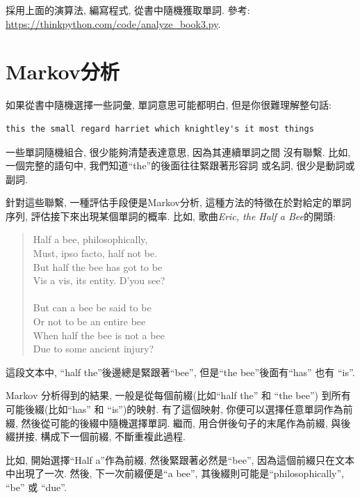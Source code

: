 \documentclass[10pt]{book}
\begin{document}
\begin{exercise}
\label{randhist}

採用上面的演算法, 編寫程式, 從書中隨機獲取單詞. 參考:
\url{https://thinkpython.com/code/analyze_book3.py}.

\end{exercise}



\section{Markov分析}
\label{markov}
如果從書中隨機選擇一些詞彙, 單詞意思可能都明白, 
但是你很難理解整句話:

\begin{verbatim}
this the small regard harriet which knightley's it most things
\end{verbatim}
%
一些單詞隨機組合, 很少能夠清楚表達意思, 因為其連續單詞之間
沒有聯繫. 比如, 一個完整的語句中, 我們知道``the''的後面往往緊跟著形容詞
或名詞, 很少是動詞或副詞. 

針對這些聯繫, 一種評估手段便是Markov分析, 這種方法的特徵在於對給定的單詞序列, 
評估接下來出現某個單詞的概率. 比如, 歌曲{\em Eric, the Half a Bee}的開頭:

\begin{quote}
Half a bee, philosophically, \\
Must, ipso facto, half not be. \\
But half the bee has got to be \\
Vis a vis, its entity. D'you see? \\
\\
But can a bee be said to be \\
Or not to be an entire bee \\
When half the bee is not a bee \\
Due to some ancient injury? \\
\end{quote}
%
這段文本中, ``half the''後邊總是緊跟著``bee'',
但是``the bee''後面有``has'' 也有 ``is''.

Markov 分析得到的結果, 一般是從每個前綴(比如``half the'' 和 ``the bee'')
到所有可能後綴(比如``has'' 和 ``is'')的映射.
有了這個映射, 你便可以選擇任意單詞作為前綴, 
然後從可能的後綴中隨機選擇單詞. 繼而, 用合併後句子的末尾作為前綴, 與後綴拼接, 
構成下一個前綴, 不斷重複此過程. 

比如, 開始選擇``Half a''作為前綴, 然後緊跟著必然是``bee'', 
因為這個前綴只在文本中出現了一次. 然後, 下一次前綴便是``a bee'', 
其後綴則可能是``philosophically'', ``be'' 或 ``due''.
\end{document}
